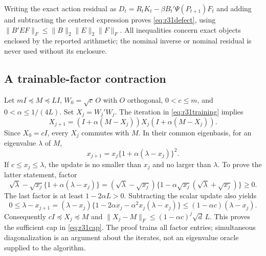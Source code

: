 \documentclass[ecta,nameyear,draft]{econsocart}
\theoremstyle{definition}
\theoremstyle{remark}
\begin{document}
Writing the exact action residual as
$D_t=R_tK_t-\beta B_t'\Psi(P_{t+1})F_t$ and adding and subtracting the
centered expression proves \eqref{eq:r31defect}, using
$\|B'EF\|_F\leq\|B\|_2\|E\|_2\|F\|_F$.
All inequalities concern exact objects enclosed by the reported arithmetic;
the nominal inverse or nominal residual is never used without its enclosure.

\subsection{A trainable-factor contraction}
Let $mI\preceq M\preceq LI$, $W_0=\sqrt c\,O$ with $O$ orthogonal,
$0<c\leq m$, and $0<\alpha\leq1/(4L)$. Set $X_j=W_j'W_j$.
The iteration in \eqref{eq:r31training} implies
\[
 X_{j+1}=(I+\alpha(M-X_j))X_j(I+\alpha(M-X_j)).
\]
Since $X_0=cI$, every $X_j$ commutes with $M$. In their common eigenbasis,
for an eigenvalue $\lambda$ of $M$,
\[
 x_{j+1}=x_j\{1+\alpha(\lambda-x_j)\}^2.
\]
If $c\leq x_j\leq\lambda$, the update is no smaller than $x_j$ and no
larger than $\lambda$. To prove the latter statement, factor
\[
 \sqrt\lambda-\sqrt{x_j}\{1+\alpha(\lambda-x_j)\}
 =(\sqrt\lambda-\sqrt{x_j})
       \{1-\alpha\sqrt{x_j}(\sqrt\lambda+\sqrt{x_j})\}\geq0.
\]
The last factor is at least $1-2\alpha L>0$. Subtracting the scalar update
also yields
\[
 0\leq\lambda-x_{j+1}
  =(\lambda-x_j)
     \{1-2\alpha x_j-\alpha^2x_j(\lambda-x_j)\}
  \leq(1-\alpha c)(\lambda-x_j).
\]
Consequently $cI\preceq X_j\preceq M$ and
$\|X_j-M\|_F\leq(1-\alpha c)^j\sqrt d\,L$.
This proves the sufficient cap in \eqref{eq:r31cap}. The proof trains all
factor entries; simultaneous diagonalization is an argument about the
iterates, not an eigenvalue oracle supplied to the algorithm.
\end{document}
